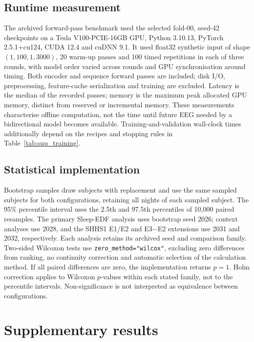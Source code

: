 \documentclass[10pt,a4paper]{article}
\begin{document}
\subsection*{Runtime measurement}

The archived forward-pass benchmark used the selected fold-00, seed-42 checkpoints on a Tesla
V100-PCIE-16GB GPU, Python 3.10.13, PyTorch 2.5.1+cu124, CUDA 12.4 and cuDNN 9.1. It used float32
synthetic input of shape $(1,100,1,3000)$, 20 warm-up passes and 100 timed repetitions in each of
three rounds, with model order varied across rounds and GPU synchronisation around timing.
Both encoder and sequence forward passes are included; disk I/O, preprocessing, feature-cache
serialization and training are excluded. Latency is the median of the recorded passes; memory
is the maximum peak allocated GPU memory, distinct from reserved or incremental memory. These
measurements characterise offline computation, not the time until future EEG needed by a
bidirectional model becomes available. Training-and-validation wall-clock times additionally
depend on the recipes and stopping rules in Table~\ref{tab:sup_training}.

\subsection*{Statistical implementation}

Bootstrap samples draw subjects with replacement and use the same sampled subjects for both
configurations, retaining all nights of each sampled subject. The 95\% percentile interval uses
the 2.5th and 97.5th percentiles of 10,000 paired resamples. The primary Sleep-EDF analysis uses
bootstrap seed 2026; context analyses use 2028, and the SHHS1 E1/E2 and E3$-$E2 extensions use
2031 and 2032, respectively. Each analysis retains its archived seed and comparison family.
Two-sided Wilcoxon tests use \texttt{zero\_method="wilcox"}, excluding zero differences from
ranking, no continuity correction and automatic selection of the calculation method. If all paired
differences are zero, the implementation returns $p=1$. Holm correction applies to Wilcoxon
$p$-values within each stated family, not to the percentile intervals. Non-significance is not
interpreted as equivalence between configurations.

\section*{Supplementary results}
\end{document}
